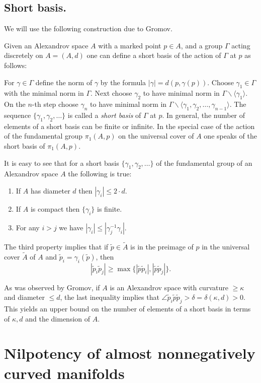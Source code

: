 \documentclass{amsart}
\begin{document}
\subsection{Short basis.}\label{short-basis} We will use the following construction due to Gromov.

Given an Alexandrov space $A$ with a marked point $p\in A$,  and  a group $\Gamma$ acting discretely on $A=(A,d)$ one can define a short basis of the action of $\Gamma$ at $p$ as follows:

For $\gamma\in \Gamma$ define the norm of $\gamma$ by the formula
$|\gamma|= d(p,\gamma(p))$.
Choose $\gamma_1\in \Gamma$
with  the minimal norm in $\Gamma$.
Next choose $\gamma_2$ to have
minimal norm in $\Gamma\backslash \langle\gamma_1\rangle$.
On the $n$-th step choose
$\gamma_n$ to have minimal norm in
$\Gamma\backslash \langle\gamma_1,\gamma_2,\dots,\gamma_{n-1}\rangle$.
The sequence $\{\gamma_1,\gamma_2,\dots\}$
is called a \emph{short basis} of $\Gamma$ at $p$.
In general, the number of elements of a short basis can be finite or infinite.
In the special case of the action of the fundamental group $\pi_1(A,p)$  on the universal cover of $A$
 one speaks of the short basis of  $\pi_1(A,p)$.

It is easy to see that for a short basis
$\{\gamma_1,\gamma_2,\dots\}$ of the fundamental group of an Alexandrov space $A$
the following is true:
\begin{enumerate}
\item If $A$ has diameter $d$ then $|\gamma_i|\le 2{\cdot} d$.
\item If $A$ is compact then $\{\gamma_i\}$ is finite.
\item For any $i>j$ we have $|\gamma_i|\le |\gamma_j^{-1}\gamma_i|$.
\end{enumerate}
The third property implies that if
$\tilde p \in \tilde A$
is in the preimage of $p$ in the universal cover $\tilde A$ of $A$
and $\tilde p_i=\gamma_i(\tilde p)$, then
$$|\tilde p_i\tilde p_j|\ge
\max\{|\tilde p\tilde p_i|,|\tilde p\tilde p_j|\}.$$

As was observed by Gromov, if $A$ is an Alexandrov space with curvature $\ge \kappa$ and diameter $\le d$, the last inequality implies that $\angle \tilde p_i \tilde p \tilde p_j>\delta=\delta(\kappa,d)>0$.
This yields an upper bound on the number of elements
of a short basis in terms of $\kappa,d$ and the dimension of $A$.


\section{Nilpotency of almost nonnegatively curved manifolds}\label{sec:nilp}
\end{document}
